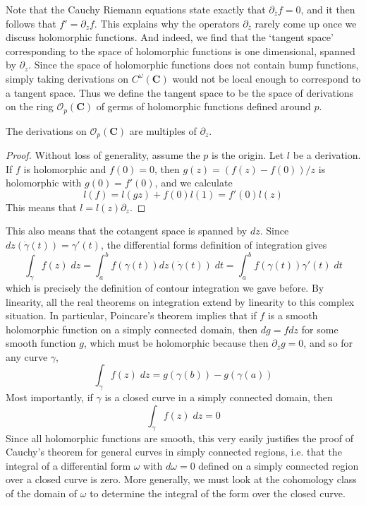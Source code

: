 Note that the Cauchy Riemann equations state exactly that $\partial_{\overline{z}} f = 0$, and it then follows that $f' = \partial_z f$. This explains why the operators $\partial_{\overline{z}}$ rarely come up once we discuss holomorphic functions. And indeed, we find that the `tangent space' corresponding to the space of holomorphic functions is one dimensional, spanned by $\partial_z$. Since the space of holomorphic functions does not contain bump functions, simply taking derivations on $C^\omega(\mathbf{C})$ would not be local enough to correspond to a tangent space. Thus we define the tangent space to be the space of derivations on the ring $\mathcal{O}_p(\mathbf{C})$ of germs of holomorphic functions defined around $p$.

\begin{theorem}
    The derivations on $\mathcal{O}_p(\mathbf{C})$ are multiples of $\partial_z$.
\end{theorem}
\begin{proof}
    Without loss of generality, assume the $p$ is the origin. Let $l$ be a derivation. If $f$ is holomorphic and $f(0) = 0$, then $g(z) = (f(z) - f(0))/z$ is holomorphic with $g(0) = f'(0)$, and we calculate
    \[ l(f) = l(gz) + f(0)l(1) = f'(0)l(z) \]
    This means that $l = l(z) \partial_z$.
\end{proof}

This also means that the cotangent space is spanned by $dz$. Since $dz(\dot{\gamma}(t)) = \gamma'(t)$, the differential forms definition of integration gives
%
\[ \int_\gamma f(z)\; dz = \int_a^b f(\gamma(t)) dz \left(\dot{\gamma}(t) \right)\; dt = \int_a^b f(\gamma(t)) \gamma'(t)\; dt \]
%
which is precisely the definition of contour integration we gave before. By linearity, all the real theorems on integration extend by linearity to this complex situation. In particular, Poincare's theorem implies that if $f$ is a smooth holomorphic function on a simply connected domain, then $dg = f dz$ for some smooth function $g$, which must be holomorphic because then $\partial_{\overline{z}} g = 0$, and so for any curve $\gamma$,
%
\[ \int_\gamma f(z)\; dz = g(\gamma(b)) - g(\gamma(a)) \]
%
Most importantly, if $\gamma$ is a closed curve in a simply connected domain, then
%
\[ \int_\gamma f(z)\; dz = 0 \]
%
Since all holomorphic functions are smooth, this very easily justifies the proof of Cauchy's theorem for general curves in simply connected regions, i.e. that the integral of a differential form $\omega$ with $d \omega = 0$ defined on a simply connected region over a closed curve is zero. More generally, we must look at the cohomology class of the domain of $\omega$ to determine the integral of the form over the closed curve.

